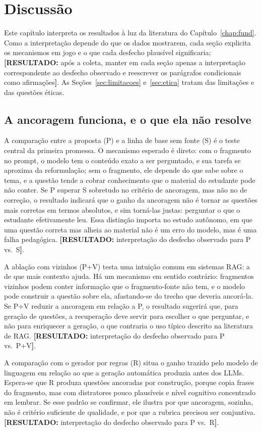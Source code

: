 \documentclass[portuguese,oneside]{tcc}
\newcommand{\resultado}[1]{\textcolor{red!70!black}{\textbf{[RESULTADO:} #1\textbf{]}}}
\begin{document}
\chapter{\label{chap:discussao}Discussão}

Este capítulo interpreta os resultados à luz da literatura do Capítulo~\ref{chap:fund}. Como a interpretação depende do que os dados mostrarem, cada seção explicita os mecanismos em jogo e o que cada desfecho plausível significaria; \resultado{após a coleta, manter em cada seção apenas a interpretação correspondente ao desfecho observado e reescrever os parágrafos condicionais como afirmações}. As Seções~\ref{sec:limitacoes} e~\ref{sec:etica} tratam das limitações e das questões éticas.

\section{A ancoragem funciona, e o que ela não resolve}

A comparação entre a proposta (P) e a linha de base sem fonte (S) é o teste central da primeira promessa. O mecanismo esperado é direto: com o fragmento no prompt, o modelo tem o conteúdo exato a ser perguntado, e sua tarefa se aproxima da reformulação; sem o fragmento, ele depende do que sabe sobre o tema, e a questão tende a cobrar conhecimento que o material do estudante pode não conter. Se P superar S sobretudo no critério de ancoragem, mas não no de correção, o resultado indicará que o ganho da ancoragem não é tornar as questões mais corretas em termos absolutos, e sim torná-las justas: perguntar o que o estudante efetivamente leu. Essa distinção importa no estudo autônomo, em que uma questão correta mas alheia ao material não é um erro do modelo, mas é uma falha pedagógica. \resultado{interpretação do desfecho observado para P vs.\ S}.

A ablação com vizinhos (P+V) testa uma intuição comum em sistemas RAG: a de que mais contexto ajuda. Há um mecanismo em sentido contrário: fragmentos vizinhos podem conter informação que o fragmento-fonte não tem, e o modelo pode construir a questão sobre ela, afastando-se do trecho que deveria ancorá-la. Se P+V reduzir a ancoragem em relação a P, o resultado sugerirá que, para geração de questões, a recuperação deve servir para escolher o que perguntar, e não para enriquecer a geração, o que contraria o uso típico descrito na literatura de RAG. \resultado{interpretação do desfecho observado para P vs.\ P+V}.

A comparação com o gerador por regras (R) situa o ganho trazido pelo modelo de linguagem em relação ao que a geração automática produzia antes dos LLMs. Espera-se que R produza questões ancoradas por construção, porque copia frases do fragmento, mas com distratores pouco plausíveis e nível cognitivo concentrado em lembrar. Se esse padrão se confirmar, ele ilustra por que ancoragem, sozinha, não é critério suficiente de qualidade, e por que a rubrica precisou ser conjuntiva. \resultado{interpretação do desfecho observado para P vs.\ R}.
\end{document}
